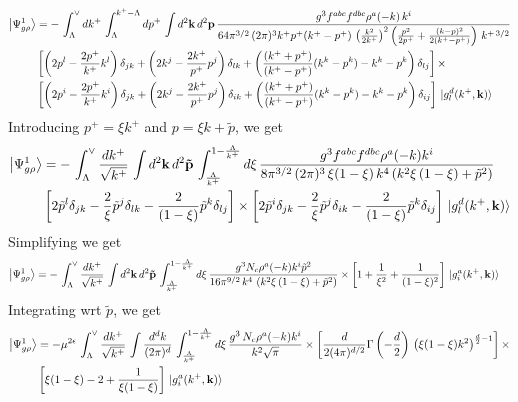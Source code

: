 \documentclass[aps,prd,amsmath,amssymb,nofootinbib]{revtex4-2}
\numberwithin{equation}{section}
\begin{document}
\begin{align}
    \left|\Psi_{g\rho}^{1}\right\rangle & = -\, \int_{\Lambda}^{\vee} dk^{+}\, \int_{\Lambda}^{k^{+}-\Lambda} dp^{+}\, \int d^{2}\mathbf{k}\, d^{2}\mathbf{p}\,\frac{g^{3}f^{abc}f^{dbc}\rho^{a}(-k)\,k^{i}}{64\pi^{3/2}\,(2\pi)^{3}k^{+}p^{+}(k^{+}-p^{+})\,\left(\frac{k^{2}}{2k^{+}}\right)^{2}\left(\frac{p^{2}}{2p^{+}}+\frac{(k-p)^{2}}{2(k^{+}-p^{+})}\right)\,k^{+\,3/2}}\notag \\ & \left[\left(2p^{l}-\frac{2p^{+}}{k^{+}}k^{l}\right)\delta_{jk}+\left(2k^{j}-\frac{2k^{+}}{p^{+}} p^{j}\right)\delta_{lk}+\left(\frac{(k^{+}+p^{+})}{(k^{+}-p^{+})}(k^{k}-p^{k})-k^{k}-p^{k}\right)\delta_{lj}\right]\times \notag \\ & \left[\left(2p^{i}-\frac{2p^{+}}{k^{+}}k^{i}\right)\delta_{jk}+\left(2k^{j}-\frac{2k^{+}}{p^{+}} p^{j}\right)\delta_{ik}+\left(\frac{(k^{+}+p^{+})}{(k^{+}-p^{+})}(k^{k}-p^{k})-k^{k}-p^{k}\right)\delta_{ij}\right]\, \ket{g^{d}_{l}(k^{+},\mathbf{k})}
\end{align}
Introducing $p^{+} = \xi k^{+}$ and $p = \xi k +\tilde{p}$, we get
\begin{align}
    \left|\Psi_{g\rho}^{1}\right\rangle & = -\, \int_{\Lambda}^{\vee} \frac{dk^{+}}{\sqrt{k^{+}}}\,\int d^{2}\mathbf{k}\, d^{2}\mathbf{\tilde{p}}\, \int_{\frac{\Lambda}{k^{+}}}^{1-\frac{\Lambda}{k^{+}}} d\xi\, \frac{g^{3}f^{abc}f^{dbc}\rho^{a}(-k)k^{i}}{8\pi^{3/2}\,(2\pi)^{3}\, \xi(1-\xi)\,k^{4}\left(k^{2}\xi\,(1-\xi)+\tilde{p}^{2}\right)}\notag \\ & \left[2\tilde{p}^{l}\delta_{jk}-\frac{2}{\xi}\tilde{p}^{j}\delta_{lk}-\frac{2}{(1-\xi)}\tilde{p}^{k}\delta_{lj}\right] \times \left[2\tilde{p}^{i}\delta_{jk}-\frac{2}{\xi}\tilde{p}^{j}\delta_{ik}-\frac{2}{(1-\xi)}\tilde{p}^{k}\delta_{ij}\right]\, \ket{g^{d}_{l}(k^{+},\mathbf{k})}
\end{align}
Simplifying we get
\begin{align}
     \left|\Psi_{g\rho}^{1}\right\rangle & = -\, \int_{\Lambda}^{\vee} \frac{dk^{+}}{\sqrt{k^{+}}}\,\int d^{2}\mathbf{k}\, d^{2}\mathbf{\tilde{p}}\, \int_{\frac{\Lambda}{k^{+}}}^{1-\frac{\Lambda}{k^{+}}} d\xi\, \frac{g^{3}N_{c}\rho^{a}(-k)k^{i}\tilde{p}^{2}}{16\pi^{9/2}\, k^{4}\,\left(k^{2}\xi\,(1-\xi)+\tilde{p}^{2}\right)}\times \left[1+\frac{1}{\xi^{2}}+\frac{1}{(1-\xi)^{2}}\right]\,\ket{g^{a}_{i}(k^{+},\mathbf{k})}
\end{align}
Integrating wrt $\tilde{p}$, we get
\begin{align}
    \left|\Psi_{g\rho}^{1}\right\rangle & = -\mu^{2\epsilon}\, \int_{\Lambda}^{\vee} \frac{dk^{+}}{\sqrt{k^{+}}} \, \int \frac{d^{d}k}{(2\pi)^{d}}\, \int_{\frac{\Lambda}{k^{+}}}^{1-\frac{\Lambda}{k^{+}}} d\xi\, \frac{g^{3}\,N_{c}\rho^{a}(-k) k^{i}}{k^{2}\sqrt{\pi}}\times \left[\frac{d}{2(4\pi)^{d/2}}\Gamma\left(-\frac{d}{2}\right)\,\left(\xi(1-\xi)k^{2}\right)^{\frac{d}{2}-1}\right]\times\notag \\ &  \left[\xi(1-\xi)-2+\frac{1}{\xi(1-\xi)}\right]\,\ket{g^{a}_{i}(k^{+},\mathbf{k})}
\end{align}
\end{document}
